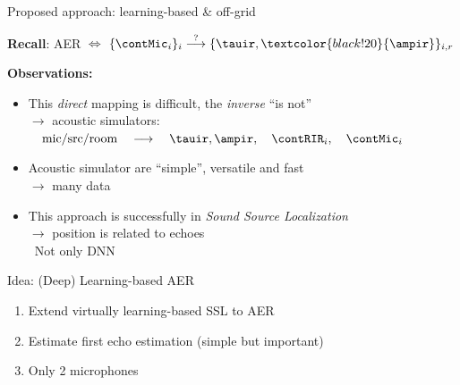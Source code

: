 \begin{frame}{Proposed approach: learning-based \& off-grid \hfill\faBrain}

    \textbf{Recall}: AER $\Leftrightarrow$ $\{\contMic_i\}_i \overset{?}{\longrightarrow} \{ \tauir, \textcolor{black!20}{\ampir} \}_{i,r}$

    \vfill
    \textbf{Observations:}
    \begin{itemize}
        \item This \textit{direct} mapping is difficult, the \textit{inverse} ``is not''
        \\$\rightarrow$ acoustic simulators:
            $\quad \text{mic/src/room}
            \quad \longrightarrow \quad
            \tauir,\ampir, \quad \contRIR_i, \quad \contMic_i$
        \item Acoustic simulator are ``simple'', versatile and fast
        \\$\to$ many data
        \item This approach is successfully in \textit{Sound Source Localization}
        \\$\to$ position is related to echoes
        \\{\small\cite{nguyen2018autonomous,perotin2019regression} \textcolor{myred}{\faExclamationTriangle~Not only DNN}}
    \end{itemize}

    \vfill
    \begin{mydefblock}{Idea: (Deep) Learning-based AER}
        \begin{enumerate}
            \item Extend \alert{virtually} learning-based SSL to AER
            \item Estimate first echo estimation (simple but important)
            \item Only 2 microphones
        \end{enumerate}
    \end{mydefblock}

\end{frame}


